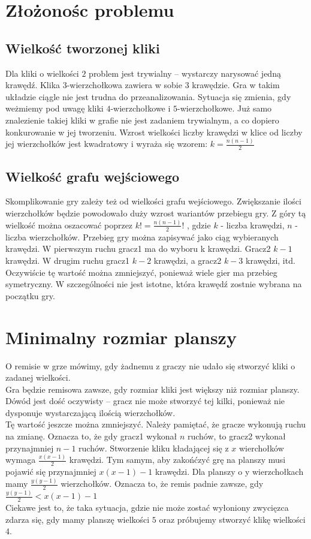 \documentclass[11pt,a4paper]{article}
\theoremstyle{definition}
\theoremstyle{remark}
\begin{document}
\section{Złożonośc problemu}

\subsection{Wielkość tworzonej kliki}
Dla kliki o wielkości $2$ problem jest trywialny -- wystarczy narysować jedną krawędź.
Klika 3-wierzchołkowa zawiera w sobie $3$ krawędzie.
 Gra w takim układzie ciągle nie jest trudna do przeanalizowania.
Sytuacja się zmienia, gdy weżmiemy pod uwagę kliki $4$-wierzchołkowe i $5$-wierzchołkowe.
Już samo znalezienie takiej kliki w grafie nie jest zadaniem trywialnym,
a co dopiero konkurowanie w jej tworzeniu.
Wzrost wielkości liczby krawędzi w klice od liczby jej wierzchołków jest kwadratowy i
wyraża się wzorem: $k = \frac{n(n - 1)}{2}$

\subsection{Wielkość grafu wejściowego}
Skomplikowanie gry zależy też od wielkości grafu wejściowego.
Zwiększanie ilości wierzchołków będzie powodowało duży wzrost wariantów przebiegu gry.
Z góry tą wielkość można oszacować poprzez $k! = \frac{n(n - 1)}{2}!$
, gdzie $k$ - liczba krawędzi, $n$ - liczba wierzchołków.
Przebieg gry można zapisywać jako ciąg wybieranych krawędzi.
W pierwszym ruchu gracz1 ma do wyboru k krawędzi. Gracz2 $k-1$ krawędzi.
W drugim ruchu gracz1 $k-2$ krawędzi, a gracz2 $k-3$ krawędzi, itd.
Oczywiście tę wartość można zmniejszyć, ponieważ wiele gier ma przebieg symetryczny.
W szczególności nie jest istotne, która krawędź zostnie wybrana na początku gry.

\section{Minimalny rozmiar planszy}
O remisie w grze mówimy, gdy żadnemu z graczy nie udało się stworzyć kliki o zadanej wielkości.\\
Gra będzie remisowa zawsze, gdy rozmiar kliki jest większy niż rozmiar planszy.
Dówód jest dość oczywisty -- gracz nie może stworzyć tej kilki,
ponieważ nie dysponuje wystarczającą ilością wierzchołków.\\
Tę wartość jeszcze można zmniejszyć.
Należy pamiętać, że gracze wykonują ruchu na zmianę. Oznacza to,
że gdy gracz1 wykonał $n$ ruchów, to gracz2 wykonał przynajmniej $n-1$ ruchów.
Stworzenie kliku kładającej się z $x$ wierchołków wymaga $\frac{x(x-1)}{2}$ krawędzi.
Tym samym, aby zakońćzyć grę na planszy musi pojawić się przynajmniej $x(x-1) - 1$ krawędzi.
Dla planszy o y wierzchołkach mamy $\frac{y(y - 1)}{2}$ wierzchołków.
Oznacza to, że remis padnie zawsze, gdy $\frac{y(y-1)}{2} < x(x-1) - 1$\\
Ciekawe jest to, że taka sytuacja, gdzie nie może zostać wyłoniony zwycięzca zdarza się,
gdy mamy planszę wielkości $5$ oraz próbujemy stworzyć klikę wielkości $4$.
\end{document}
